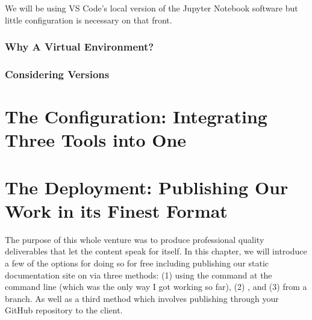 \documentclass[letterpaper,12pt,english]{sphinxmanual}
\begin{document}
\sphinxAtStartPar
We will be using VS Code’s local version of the Jupyter Notebook software but little configuration is necessary on that front.


\subsection{Why A Virtual Environment?}
\label{\detokenize{_notebooks/01-the-env:why-a-virtual-environment}}

\subsection{Considering Versions}
\label{\detokenize{_notebooks/01-the-env:considering-versions}}
\sphinxstepscope


\chapter{The Configuration: Integrating Three Tools into One}
\label{\detokenize{_notebooks/02-the-config:the-configuration-integrating-three-tools-into-one}}\label{\detokenize{_notebooks/02-the-config::doc}}
\sphinxstepscope


\chapter{The Deployment: Publishing Our Work in its Finest Format}
\label{\detokenize{_notebooks/03-the-deploy:the-deployment-publishing-our-work-in-its-finest-format}}\label{\detokenize{_notebooks/03-the-deploy::doc}}
\sphinxAtStartPar
The purpose of this whole venture was to produce professional quality deliverables that let the content speak for itself. In this chapter, we will introduce a few of the options for doing so \textendash{}for free\textendash{} including publishing our static documentation site on  via three methods: (1) using the  command at the command line (which was the only way I got working so far), (2) , and (3) from a branch. As well as a third method which involves publishing through your GitHub repository to the  client.
\end{document}
